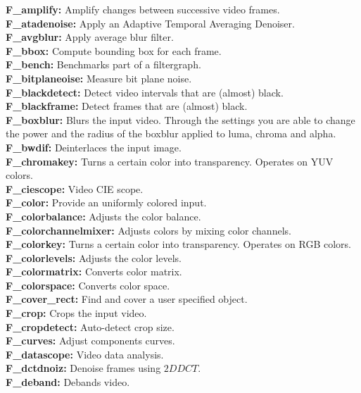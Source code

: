 \noindent \textbf{F\_amplify:} Amplify changes between successive video frames.\\
\textbf{F\_atadenoise:} Apply an Adaptive Temporal Averaging Denoiser.\\
\textbf{F\_avgblur:} Apply average blur filter.\\
\textbf{F\_bbox:} Compute bounding box for each frame.\\
\textbf{F\_bench:} Benchmarks part of a filtergraph.\\
\textbf{F\_bitplaneoise:} Measure bit plane noise.\\
\textbf{F\_blackdetect:} Detect video intervals that are (almost) black.\\
\textbf{F\_blackframe:} Detect frames that are (almost) black.\\
\textbf{F\_boxblur:} Blurs the input video. Through the settings you are able to change the power and the radius of the boxblur applied to luma, chroma and alpha.\\
\textbf{F\_bwdif:} Deinterlaces the input image.\\
\textbf{F\_chromakey:} Turns a certain color into transparency. Operates on YUV colors.\\
\textbf{F\_ciescope:} Video CIE scope.\\
\textbf{F\_color:} Provide an uniformly colored input.\\
\textbf{F\_colorbalance:} Adjusts the color balance.\\
\textbf{F\_colorchannelmixer:} Adjusts colors by mixing color channels.\\
\textbf{F\_colorkey:} Turns a certain color into transparency. Operates on RGB colors.\\
\textbf{F\_colorlevels:} Adjusts the color levels.\\
\textbf{F\_colormatrix:} Converts color matrix.\\
\textbf{F\_colorspace:} Converts color space.\\
\textbf{F\_cover\_rect:} Find and cover a user specified object.\\
\textbf{F\_crop:} Crops the input video.\\
\textbf{F\_cropdetect:} Auto-detect crop size.\\
\textbf{F\_curves:} Adjust components curves.\\
\textbf{F\_datascope:} Video data analysis.\\
\textbf{F\_dctdnoiz:} Denoise frames using $2D DCT$.\\
\textbf{F\_deband:} Debands video.\\
